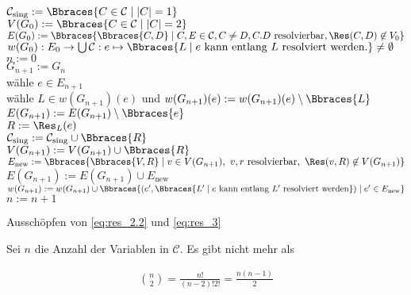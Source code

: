 \begin{solution}
\begin{algorithm}[H]
    $\mathcal C_\text{sing} := \Bbraces{C \in \mathcal C \mid |C| = 1}$ \\
    $V(G_0) := \Bbraces{C \in \mathcal C \mid |C| = 2}$ \\
    $E(G_0) := \Bbraces{\Bbraces{C, D} \mid C, E \in \mathcal C, C \neq D, C. D ~\text{resolvierbar}, \Res(C, D) \not \in V_0}$ \\
    $w(G_0): E_0 \to \bigcup \mathcal C: e \mapsto \Bbraces{L \mid e ~\text{kann entlang}~ L ~\text{resolviert werden.}} \neq \emptyset$ \\
    $n := 0$ \\
    {
        $G_{n+1} := G_n$ \\
        wähle $e \in E_{n+1}$ \\
        wähle $L \in w(G_{n+1})(e)$ und $w(G_{n+1})(e) := w(G_{n+1})(e) \setminus \Bbraces{L}$ \\
        {
            $E(G_{n+1}) := E(G_{n+1}) \setminus \Bbraces{e}$ \\
        }
        $R := \Res_L(e)$ \\
        {
            $\mathcal C_\text{sing} := \mathcal C_\text{sing} \cup \Bbraces{R}$ \\
        }{
            $V(G_{n+1}) := V(G_{n+1}) \cup \Bbraces{R}$ \\
            $E_\text{new} := \Bbraces{\Bbraces{V, R} \mid v \in V(G_{n+1}), ~ v, r ~\text{resolvierbar}, ~ \Res(v, R) \not \in V(G_{n+1})}$ \\
            $E(G_{n+1}) := E(G_{n+1}) \cup E_\text{new}$ \\
            $w(G_{n+1}) := w(G_{n+1}) \cup \Bbraces{(e^\prime, \Bbraces{L^\prime \mid e ~\text{kann entlang}~ L^\prime ~\text{resolviert werden}}) \mid e^\prime \in E_\text{new}}$ \\
        }
        $n := n + 1$ \\
    }
    \caption
    {
        Ausschöpfen von \eqref{eq:res_2.2} und \eqref{eq:res_3}
    }
\end{algorithm}

Sei $n$ die Anzahl der Variablen in $\mathcal C$.
Es gibt nicht mehr als

\begin{align*}
    \binom{n}{2}
    =
    \frac{n!}{(n-2)! 2!}
    =
    \frac{n (n-1)}{2}
\end{align*}


\end{solution}
